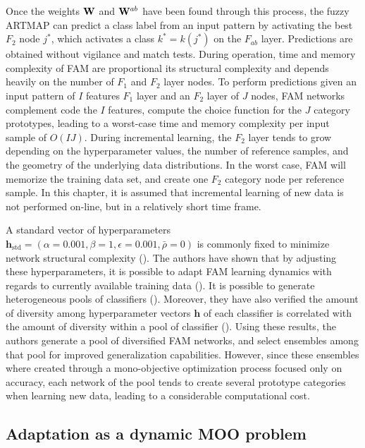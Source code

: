 Once the weights ${\bf W}$ and ${\bf W}^{ab}$ have been found through this process, the fuzzy ARTMAP can predict a class label from an input pattern by activating the best $F_2$ node $j^*$, which activates a class $k^*=k(j^*)$ on the $F_{ab}$ layer.
Predictions are obtained without vigilance and match tests. 
During operation, time and memory complexity of FAM are proportional its structural complexity and depends heavily on the number of $F_1$ and $F_2$ layer nodes.
To perform predictions given an input pattern of $I$ features $F_1$ layer and an $F_2$ layer of $J$ nodes, FAM networks complement code the $I$ features, compute the choice function for the $J$ category prototypes, leading to a worst-case time and memory complexity per input sample of $O(IJ)$.
During incremental learning, the $F_2$ layer tends to grow depending on the hyperparameter values, the number of reference samples, and the geometry of the underlying data distributions.
In the worst case, FAM will memorize the training data set, and create one $F_2$ category node per reference sample.
In this chapter, it is assumed that incremental learning of new data is not performed on-line, but in a relatively short time frame.

A standard vector of hyperparameters $\textbf{h}_\text{std} = (\alpha = 0.001, \beta=1, \epsilon=0.001, \bar{\rho}=0)$ is commonly fixed to minimize network structural complexity (\cite{carpenter92}).
The authors have shown that by adjusting these hyperparameters, it is possible to adapt FAM learning dynamics with regards to currently available training data (\cite{connolly10, connolly11, granger07}).
It is possible to generate heterogeneous pools of classifiers (\cite{connolly10_2}).
Moreover, they have also verified the amount of diversity among hyperparameter vectors $\textbf{h}$ of each classifier is correlated with the amount of diversity within a pool of classifier (\cite{connolly11}).
Using these results, the authors generate a pool of diversified FAM networks, and select ensembles among that pool for improved generalization capabilities.
However, since these ensembles where created through a mono-objective optimization process focused only on accuracy, each network of the pool tends to create several prototype categories when learning new data, leading to a considerable computational cost.

\subsection{Adaptation as a dynamic MOO problem}


